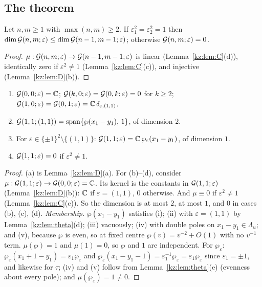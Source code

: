 \subsection{The theorem}\label{kz:sec:thm}

\begin{proposition}\label{kz:prop:induct}
Let $n,m\ge1$ with $\max(n,m)\ge2$. If $\varepsilon_1^2=\varepsilon_2^2=1$ then
$\dim\mathcal{G}(n,m;\varepsilon)\le\dim\mathcal{G}(n-1,m-1;\varepsilon)$; otherwise $\mathcal{G}(n,m;\varepsilon)=0$.
\end{proposition}

\begin{proof}
$\mu:\mathcal{G}(n,m;\varepsilon)\to\mathcal{G}(n-1,m-1;\varepsilon)$ is linear (Lemma~\ref{kz:lem:C}(d)), identically zero if
$\varepsilon^2\neq1$ (Lemma~\ref{kz:lem:C}(c)), and injective (Lemma~\ref{kz:lem:D}(b)).
\end{proof}

\begin{proposition}\label{kz:prop:base}
\begin{enumerate}
\item[(a)] $\mathcal{G}(0,0;\varepsilon)=\mathbb{C}$; $\mathcal{G}(k,0;\varepsilon)=\mathcal{G}(0,k;\varepsilon)=0$ for $k\ge2$;
$\mathcal{G}(1,0;\varepsilon)=\mathcal{G}(0,1;\varepsilon)=\mathbb{C}\,\delta_{\varepsilon,(1,1)}$.
\item[(b)] $\mathcal{G}(1,1;(1,1))=\mathrm{span}\{\wp(x_1-y_1),\,1\}$, of dimension $2$.
\item[(c)] For $\varepsilon\in\{\pm1\}^2\setminus\{(1,1)\}$: $\mathcal{G}(1,1;\varepsilon)=\mathbb{C}\,\wp_\varepsilon(x_1-y_1)$, of dimension $1$.
\item[(d)] $\mathcal{G}(1,1;\varepsilon)=0$ if $\varepsilon^2\neq1$.
\end{enumerate}
\end{proposition}

\begin{proof}
(a) is Lemma~\ref{kz:lem:D}(a). For (b)--(d), consider $\mu:\mathcal{G}(1,1;\varepsilon)\to\mathcal{G}(0,0;\varepsilon)=\mathbb{C}$. Its kernel is the
constants in $\mathcal{G}(1,1;\varepsilon)$ (Lemma~\ref{kz:lem:D}(b)): $\mathbb{C}$ if $\varepsilon=(1,1)$, $0$ otherwise. And $\mu\equiv0$ if
$\varepsilon^2\ne1$ (Lemma~\ref{kz:lem:C}(c)). So the dimension is at most $2$, at most $1$, and $0$ in cases (b), (c),
(d). \emph{Membership.} $\wp(x_1-y_1)$ satisfies (i); (ii) with $\varepsilon=(1,1)$ by Lemma~\ref{kz:lem:theta}(d);
(iii) vacuously; (iv) with double poles on $x_1-y_1\in\Lambda_u$; and (v), because $\wp$ is even, so at fixed
centre $\wp(v)=v^{-2}+O(1)$ with no $v^{-1}$ term. $\mu(\wp)=1$ and $\mu(1)=0$, so $\wp$ and $1$ are independent.
For $\wp_\varepsilon$: $\wp_\varepsilon(x_1+1-y_1)=\varepsilon_1\wp_\varepsilon$ and $\wp_\varepsilon(x_1-y_1-1)=\varepsilon_1^{-1}\wp_\varepsilon=\varepsilon_1\wp_\varepsilon$ since
$\varepsilon_1=\pm1$, and likewise for $\tau$; (iv) and (v) follow from Lemma~\ref{kz:lem:theta}(e) (evenness about every
pole); and $\mu(\wp_\varepsilon)=1\ne0$.
\end{proof}

